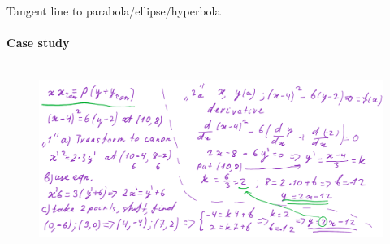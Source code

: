 \documentclass[aspectratio=169]{beamer}
\begin{document}
\begin{frame}[t]{Tangent line to parabola/ellipse/hyperbola}
\framesubtitle{Case study}
    \vspace{-0.6cm}
    \begin{figure}[H]
        \centering\includegraphics[height=6cm,width=1\textwidth,keepaspectratio]{tangent.png}
        \label{fig:tangent.png}
    \end{figure}
\end{frame}
\end{document}
